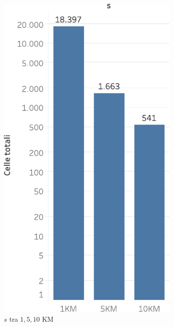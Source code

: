 \begin{figure}
  \centering
  \begin{subfigure}{.5\textwidth}
  \centering
   \includegraphics[scale=0.5]{res/fig/sec-4/Cells.pdf}
   \caption{\(s\) tra \(1,5,10\) KM}
  \label{fig:chap-4:cells}
\end{subfigure}%
\begin{subfigure}{.5\textwidth}
  \centering

\end{subfigure}
\end{figure}
